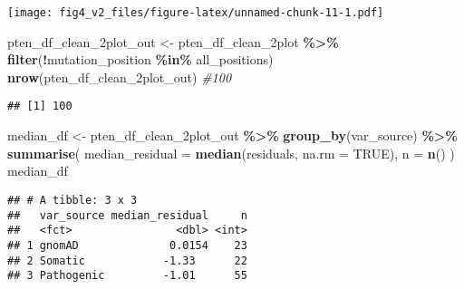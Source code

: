 \documentclass[
]{article}
\newenvironment{Shaded}{\begin{snugshade}}{\end{snugshade}}
\newcommand{\AttributeTok}[1]{\textcolor[rgb]{0.13,0.29,0.53}{#1}}
\newcommand{\CommentTok}[1]{\textcolor[rgb]{0.56,0.35,0.01}{\textit{#1}}}
\newcommand{\ConstantTok}[1]{\textcolor[rgb]{0.56,0.35,0.01}{#1}}
\newcommand{\FunctionTok}[1]{\textcolor[rgb]{0.13,0.29,0.53}{\textbf{#1}}}
\newcommand{\NormalTok}[1]{#1}
\newcommand{\OtherTok}[1]{\textcolor[rgb]{0.56,0.35,0.01}{#1}}
\newcommand{\SpecialCharTok}[1]{\textcolor[rgb]{0.81,0.36,0.00}{\textbf{#1}}}
\begin{document}
\texttt{[image: fig4\_v2\_files/figure-latex/unnamed-chunk-11-1.pdf]}

\begin{Shaded}
\begin{Highlighting}[]
\NormalTok{pten\_df\_clean\_2plot\_out }\OtherTok{\textless{}{-}}\NormalTok{ pten\_df\_clean\_2plot }\SpecialCharTok{\%\textgreater{}\%} \FunctionTok{filter}\NormalTok{(}\SpecialCharTok{!}\NormalTok{mutation\_position }\SpecialCharTok{\%in\%}\NormalTok{ all\_positions)}
\FunctionTok{nrow}\NormalTok{(pten\_df\_clean\_2plot\_out) }\CommentTok{\#100}
\end{Highlighting}
\end{Shaded}

\begin{verbatim}
## [1] 100
\end{verbatim}

\begin{Shaded}
\begin{Highlighting}[]
\NormalTok{median\_df }\OtherTok{\textless{}{-}}\NormalTok{ pten\_df\_clean\_2plot\_out }\SpecialCharTok{\%\textgreater{}\%}
  \FunctionTok{group\_by}\NormalTok{(var\_source) }\SpecialCharTok{\%\textgreater{}\%}
  \FunctionTok{summarise}\NormalTok{(}
    \AttributeTok{median\_residual =} \FunctionTok{median}\NormalTok{(residuals, }\AttributeTok{na.rm =} \ConstantTok{TRUE}\NormalTok{),}
    \AttributeTok{n =} \FunctionTok{n}\NormalTok{()}
\NormalTok{  )}
\NormalTok{median\_df}
\end{Highlighting}
\end{Shaded}

\begin{verbatim}
## # A tibble: 3 x 3
##   var_source median_residual     n
##   <fct>                <dbl> <int>
## 1 gnomAD              0.0154    23
## 2 Somatic            -1.33      22
## 3 Pathogenic         -1.01      55
\end{verbatim}
\end{document}
